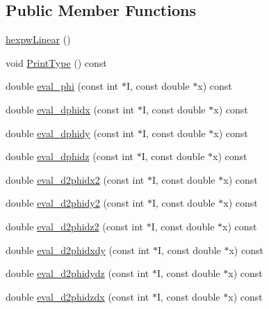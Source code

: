 \subsection*{Public Member Functions}
\begin{DoxyCompactItemize}
\item 
\mbox{\hyperlink{classfemus_1_1hexpw_linear_a19059388df40fa2b1191830535c0cd5a}{hexpw\+Linear}} ()
\item 
void \mbox{\hyperlink{classfemus_1_1hexpw_linear_a735e1f1b8e35cddcecfa075dadc460c4}{Print\+Type}} () const
\item 
double \mbox{\hyperlink{classfemus_1_1hexpw_linear_a357f1070933e0eb6ccab44ee02a36ecf}{eval\+\_\+phi}} (const int $\ast$I, const double $\ast$x) const
\item 
double \mbox{\hyperlink{classfemus_1_1hexpw_linear_a954c0487a8e7fb613697353f7e463024}{eval\+\_\+dphidx}} (const int $\ast$I, const double $\ast$x) const
\item 
double \mbox{\hyperlink{classfemus_1_1hexpw_linear_a6ebee6c469d4a59ad8fa29b797a9bd23}{eval\+\_\+dphidy}} (const int $\ast$I, const double $\ast$x) const
\item 
double \mbox{\hyperlink{classfemus_1_1hexpw_linear_ac46b6a5791227243a89846dbcb967df2}{eval\+\_\+dphidz}} (const int $\ast$I, const double $\ast$x) const
\item 
double \mbox{\hyperlink{classfemus_1_1hexpw_linear_a08b0b6ced1587ddf865452d6039c5e0b}{eval\+\_\+d2phidx2}} (const int $\ast$I, const double $\ast$x) const
\item 
double \mbox{\hyperlink{classfemus_1_1hexpw_linear_ab01049b3e87767f0f4b04a9cec8efa77}{eval\+\_\+d2phidy2}} (const int $\ast$I, const double $\ast$x) const
\item 
double \mbox{\hyperlink{classfemus_1_1hexpw_linear_a20b5ae15c57b98fce4255ee29f36456d}{eval\+\_\+d2phidz2}} (const int $\ast$I, const double $\ast$x) const
\item 
double \mbox{\hyperlink{classfemus_1_1hexpw_linear_ac0018245cf34cd4fc79de13e42b32817}{eval\+\_\+d2phidxdy}} (const int $\ast$I, const double $\ast$x) const
\item 
double \mbox{\hyperlink{classfemus_1_1hexpw_linear_abf571d202f00205f9befd746266744a6}{eval\+\_\+d2phidydz}} (const int $\ast$I, const double $\ast$x) const
\item 
double \mbox{\hyperlink{classfemus_1_1hexpw_linear_a05244a29bbca8fae4a87d97f5306d4a0}{eval\+\_\+d2phidzdx}} (const int $\ast$I, const double $\ast$x) const
\end{DoxyCompactItemize}
